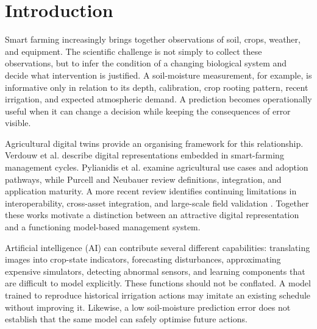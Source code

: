\documentclass[acmsmall,screen,nonacm]{acmart}
\begin{document}
\maketitle

\section{Introduction}

\label{sec:1}

Smart farming increasingly brings together observations of soil, crops, weather, and equipment. The scientific challenge is not simply to collect these observations, but to infer the condition of a changing biological system and decide what intervention is justified. A soil-moisture measurement, for example, is informative only in relation to its depth, calibration, crop rooting pattern, recent irrigation, and expected atmospheric demand. A prediction becomes operationally useful when it can change a decision while keeping the consequences of error visible.

Agricultural digital twins provide an organising framework for this relationship. Verdouw et al. \cite{R01} describe digital representations embedded in smart-farming management cycles. Pylianidis et al. \cite{R02} examine agricultural use cases and adoption pathways, while Purcell and Neubauer \cite{R03} review definitions, integration, and application maturity. A more recent review identifies continuing limitations in interoperability, cross-asset integration, and large-scale field validation \cite{R04}. Together these works motivate a distinction between an attractive digital representation and a functioning model-based management system.

Artificial intelligence (AI) can contribute several different capabilities: translating images into crop-state indicators, forecasting disturbances, approximating expensive simulators, detecting abnormal sensors, and learning components that are difficult to model explicitly. These functions should not be conflated. A model trained to reproduce historical irrigation actions may imitate an existing schedule without improving it. Likewise, a low soil-moisture prediction error does not establish that the same model can safely optimise future actions.
\end{document}

